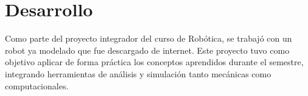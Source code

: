 \chapter{Desarrollo} \label{chap:desarrollo}
Como parte del proyecto integrador del curso de Robótica, se trabajó con un robot ya modelado que fue descargado de internet. Este proyecto tuvo como objetivo aplicar de forma práctica los conceptos aprendidos durante el semestre, integrando herramientas de análisis y simulación tanto mecánicas como computacionales.
